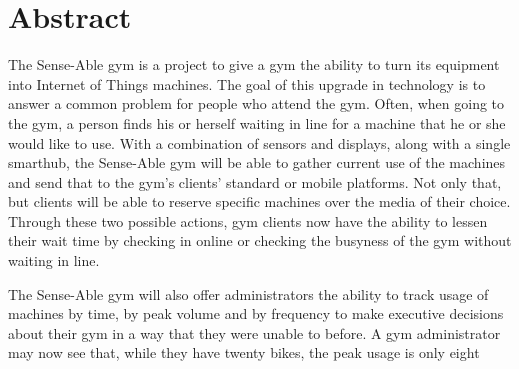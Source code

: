 \documentclass[PPFS.tex]{template/subfiles}
\begin{document}
\section*{Abstract}

The Sense-Able gym is a project to give a gym the ability to turn its equipment into Internet of Things machines. The goal of this upgrade in technology is to answer a common problem for people who attend the gym. Often,  when going to the gym, a person finds his or herself  waiting in line for a machine that he or she would like to use.  With a combination of sensors and displays, along with a single smarthub, the Sense-Able gym will be able to gather current use of the machines and send that to the gym's clients' standard or mobile platforms. Not only that, but clients will be able to reserve specific machines over the media of their choice. Through these two possible actions, gym clients now have the ability to lessen their wait time by checking in online or checking the busyness of the gym without waiting in line.

The Sense-Able gym will also offer administrators the ability to track usage of machines by time, by peak volume and by frequency to make executive decisions about their gym in a way that they were unable to before. A gym administrator may now see that, while they have twenty bikes, the peak usage is only eight
\end{document}
